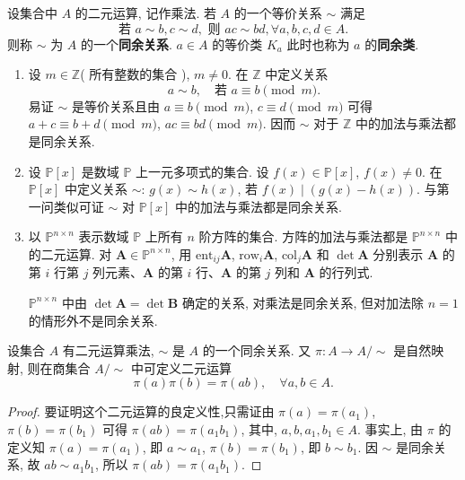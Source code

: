 \documentclass[../../main.tex]{subfiles}%
\begin{document}
\begin{definition}[同余关系和同余类]
设集合中 \( A \) 的二元运算, 记作乘法. 若 \( A \) 的一个等价关系 \( \sim \) 满足
\[
\text{若 } a \sim b, c \sim d, \text{ 则 } ac \sim bd, \forall a,b,c,d \in A .
\]
则称 \( \sim \) 为 \( A \) 的一个\textbf{同余关系}. \( a \in A \) 的等价类 \( K_a \) 此时也称为 \( a \) 的\textbf{同余类}.
\end{definition}

\begin{example}
\begin{enumerate}
\item 设 \( m \in \mathbb{Z} \)( 所有整数的集合 ), \( m \neq 0 \). 在 \( \mathbb{Z} \) 中定义关系
\[
a \sim b, \quad \text{若 } a \equiv b \pmod{m}.
\]
易证 \( \sim \) 是等价关系且由 \( a \equiv b \pmod{m} \), \( c \equiv d \pmod{m} \) 可得 \( a + c \equiv b + d \pmod{m} \), \( ac \equiv bd \pmod{m} \). 因而 \( \sim \) 对于 \( \mathbb{Z} \) 中的加法与乘法都是同余关系.

\item 设 \( \mathbb{P}[x] \) 是数域 \( \mathbb{P} \) 上一元多项式的集合. 设 \( f(x) \in \mathbb{P}[x] \), \( f(x) \neq 0 \). 在 \( \mathbb{P}[x] \) 中定义关系 \( \sim \): \( g(x) \sim h(x) \), 若 \( f(x) \mid (g(x) - h(x)) \). 与第一问类似可证 \( \sim \) 对 \( \mathbb{P}[x] \) 中的加法与乘法都是同余关系.

\item 以 \( \mathbb{P}^{n \times n} \) 表示数域 \( \mathbb{P} \) 上所有 \( n \) 阶方阵的集合. 方阵的加法与乘法都是 \( \mathbb{P}^{n \times n} \) 中的二元运算. 对 \( \boldsymbol{A} \in \mathbb{P}^{n \times n} \), 用 \( \text{ent}_{ij}\boldsymbol{A} \), \( \text{row}_i\boldsymbol{A} \), \( \text{col}_j\boldsymbol{A} \) 和 \( \det\boldsymbol{A} \) 分别表示 \( \boldsymbol{A} \) 的第 \( i \) 行第 \( j \) 列元素、\( \boldsymbol{A} \) 的第 \( i \) 行、\( \boldsymbol{A} \) 的第 \( j \) 列和 \( \boldsymbol{A} \) 的行列式.

\( \mathbb{P}^{n \times n} \) 中由 \( \det\boldsymbol{A} = \det\boldsymbol{B} \) 确定的关系, 对乘法是同余关系, 但对加法除 \( n = 1 \) 的情形外不是同余关系.
\end{enumerate}
\end{example}

\begin{theorem}\label{theorem:同余关系诱导商集中的乘法-定理1.1.3}
设集合 \( A \) 有二元运算乘法, \( \sim \) 是 \( A \) 的一个同余关系. 又 \( \pi: A \to A/\sim \) 是自然映射, 则在商集合 \( A/\sim \) 中可定义二元运算
\[
\pi(a)\pi(b) = \pi(ab),\quad \forall a,b \in A .
\]
\end{theorem}
\begin{proof}
要证明这个二元运算的良定义性,只需证由 \( \pi(a) = \pi(a_1) \), \( \pi(b) = \pi(b_1) \) 可得 \( \pi(ab) = \pi(a_1b_1) \), 其中, \( a,b,a_1, b_1 \in A \). 事实上, 由 \( \pi \) 的定义知 \( \pi(a) = \pi(a_1) \), 即 \( a \sim a_1 \), \( \pi(b) = \pi(b_1) \), 即 \( b \sim b_1 \). 因 \( \sim \) 是同余关系, 故 \( ab \sim a_1b_1 \), 所以 \( \pi(ab) = \pi(a_1b_1) \).
\end{proof}
\end{document}
